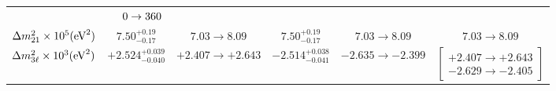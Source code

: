 \begin{table}
{\begin{tabular}{c|cc|cc|c}
      & $\hphantom{00}0 \to 360$
      \\[3mm]
      $\Delta m^2_{21}\times10^{5} (\text{eV}^2)$
      & $7.50_{-0.17}^{+0.19}$ & $7.03 \to 8.09$
      & $7.50_{-0.17}^{+0.19}$ & $7.03 \to 8.09$
      & $7.03 \to 8.09$
      \\[3mm]      
      $\Delta m^2_{3\ell}\times10^{3} (\text{eV}^2)$
      & $+2.524_{-0.040}^{+0.039}$ & $+2.407 \to +2.643$
      & $-2.514_{-0.041}^{+0.038}$ & $-2.635 \to -2.399$
      & $\begin{bmatrix}
        +2.407 \to +2.643\\[-2pt]
        -2.629 \to -2.405
      \end{bmatrix}$
      \\[3mm]
      \hline\hline
    \end{tabular}%
  }
\end{table}

